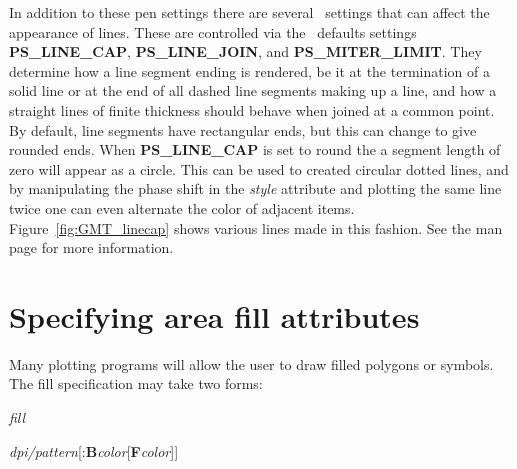 In addition to these pen settings there are several \PS\ settings that can affect the appearance of lines.
These are controlled via the \GMT\ defaults settings \textbf{PS\_LINE\_CAP}, \textbf{PS\_LINE\_JOIN},
and \textbf{PS\_MITER\_LIMIT}. They determine how a line segment ending is rendered, be it at the
termination of a solid line or at the end of all dashed line segments making up a line, and how a
straight lines of finite thickness should behave when joined at a common point.  By default, line segments
have rectangular ends, but this can change to give rounded ends.  When \textbf{PS\_LINE\_CAP} is set to
round the a segment length of zero will appear as a circle.  This can be used to created circular dotted
lines, and by manipulating the phase shift in the \emph{style} attribute and plotting the same line twice
one can even alternate the color of adjacent items.  Figure~\ref{fig:GMT_linecap} shows various lines made
in this fashion.  See the  man page for more information.

\section{Specifying area fill attributes}

%
%
%
%
%
%
%
\label{sec:fill}

Many plotting programs will allow the user to draw filled polygons or
symbols.  The fill specification may take two forms:

\vspace{\baselineskip}

\par {}\emph{fill}\par

\par {}\emph{dpi/pattern}[:\textbf{B}\emph{color}[\textbf{F}\emph{color}]]\par


